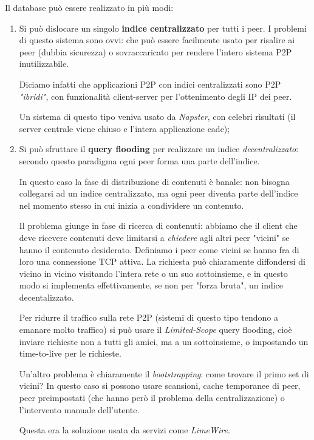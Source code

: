 \documentclass[a4paper,11pt]{article}
\begin{document}
Il database può essere realizzato in più modi:
\begin{enumerate}
	\item Si può dislocare un singolo \textbf{indice centralizzato} per tutti i peer. I problemi di questo sistema sono ovvi: che può essere facilmente usato per risalire ai peer (dubbia sicurezza) o sovraccaricato per rendere l'intero sistema P2P inutilizzabile.

		Diciamo infatti che applicazioni P2P con indici centralizzati sono P2P \textit{"ibridi"}, con funzionalità client-server per l'ottenimento degli IP dei peer.

		Un sistema di questo tipo veniva usato da \textit{Napster}, con celebri risultati (il server centrale viene chiuso e l'intera applicazione cade);

	\item Si può sfruttare il \textbf{query flooding} per realizzare un indice \textit{decentralizzato}: secondo questo paradigma ogni peer forma una parte dell'indice.
	
		In questo caso la fase di distribuzione di contenuti è banale: non bisogna collegarsi ad un indice centralizzato, ma ogni peer diventa parte dell'indice nel momento stesso in cui inizia a condividere un contenuto.

		Il problema giunge in fase di ricerca di contenuti: abbiamo che il client che deve ricevere contenuti deve limitarsi a \textit{chiedere} agli altri peer "vicini" se hanno il contenuto desiderato. Definiamo i peer come vicini se hanno fra di loro una connessione TCP attiva. 
		La richiesta può chiaramente diffondersi di vicino in vicino visitando l'intera rete o un suo sottoinsieme, e in questo modo si implementa effettivamente, se non per "forza bruta", un indice decentalizzato.

	Per ridurre il traffico sulla rete P2P (sistemi di questo tipo tendono a emanare molto traffico) si può usare il \textit{Limited-Scope} query flooding, cioè inviare richieste non a tutti gli amici, ma a un sottoinsieme, o impostando un time-to-live per le richieste.

	Un'altro problema è chiaramente il \textit{bootstrapping}: come trovare il primo set di vicini? In questo caso si possono usare scansioni, cache temporanee di peer, peer preimpostati (che hanno però il problema della centralizzazione) o l'intervento manuale dell'utente.

		Questa era la soluzione usata da servizi come \textit{LimeWire}.


\end{enumerate}
\end{document}
